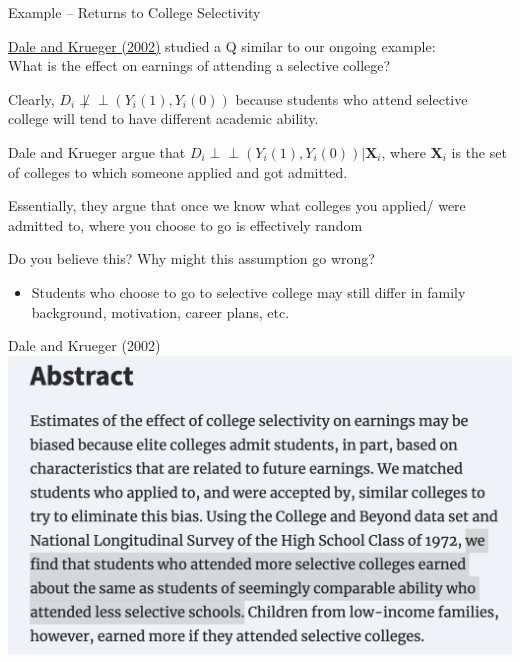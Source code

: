 \documentclass[11pt,english,handout]{beamer}
\newenvironment{wideitemize}{\itemize\addtolength{\itemsep}{10pt}}{\enditemize}
\newcommand{\indep}{\perp\!\!\!\!\perp}
\begin{document}
\begin{frame}{Example -- Returns to College Selectivity}
\begin{wideitemize}
\item
\href{https://academic.oup.com/qje/article-abstract/117/4/1491/1876022}{\uline{Dale and Krueger (2002)}} studied a Q similar to our ongoing example: \\
What is the effect on earnings of attending a selective college?

\item 
Clearly, $D_i \not\indep (Y_i(1),Y_i(0))$ because students who attend selective college will tend to have different academic ability. 

\pause
\item
Dale and Krueger argue that $D_i \indep (Y_i(1),Y_i(0)) | \mathbf{X}_i$, where $\mathbf{X}_i$ is the set of colleges to which someone applied and got admitted. 

\item
Essentially, they argue that once we know what colleges you applied/ were admitted to, where you choose to go is effectively random

\pause
\item
Do you believe this? Why might this assumption go wrong? 
\pause
	\begin{itemize}
		\item 
		Students who choose to go to selective college may still differ in family background, motivation, career plans, etc. 
	\end{itemize}
\end{wideitemize}
\end{frame}

\begin{frame}{Dale and Krueger (2002)}
	\centering
	\includegraphics[width = 0.9\linewidth]{dale-krueger}
\end{frame}
\end{document}
